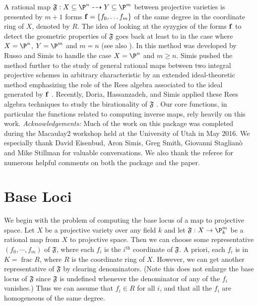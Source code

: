 \documentclass[11pt]{amsart}
\numberwithin{equation}{theorem}
\def\ff{{\bf f}}
\renewcommand{\:}{\colon}
\DeclareMathOperator{\ffield}{frac} %
\theoremstyle{theorem}
\begin{document}
A rational map $\mathfrak{F}:X\subseteq \P^n\dasharrow Y \subseteq \P^m$ between projective varieties is presented by $m+1$ forms $\ff=\{f_0,\ldots f_m\}$ of the same degree in the coordinate ring of $X$, denoted by  $R$.
The idea of looking at the syzygies of the forms $\ff$ to detect the geometric properties of  $\mathfrak{F}$ goes
back at least to \cite{HulekKatzSchreyer} in the case
where $X=\P^n$, $Y = \P^m$ and $m=n$ (see also \cite{SempleTyrrell}). In \cite{RussoSimisCompositio}  this method was developed by Russo and Simis
to handle the case $X=\P^n$ and $m\geq n$. Simis pushed the method further to the study
of general rational maps between two integral projective schemes in
arbitrary characteristic by an extended ideal-theoretic method
emphasizing the role of the Rees algebra associated to the ideal
generated by $\ff$ \cite{SimisCremona}.  Recently,  Doria, Hassanzadeh, and Simis applied these
 Rees algebra techniques to study the birationality of  $\mathfrak{F}$ \cite{DoriaHassanzadehSimisBirationality}.  Our core functions, in particular the functions related to computing inverse maps, rely heavily on this work.
\vskip 12pt
\noindent
\emph{Acknowledgements:}  Much of the work  on this package was completed during the Macaulay2 workshop held at the University of Utah in May 2016.  We especially thank David Eisenbud, Aron Simis, Greg Smith, Giovanni Staglian\`o and Mike Stillman for valuable conversations.  We also thank the referee for numerous helpful comments on both the package and the paper.

\section{Base Loci}

We begin with the problem of computing the base locus of a map to projective space. Let $X$ be a projective variety over any field $k$ and let $\mathfrak{F}: X \to \P_k^m$ be a rational map from $X$ to projective space. Then we can choose some representative $(f_0, \cdots, f_m)$ of $\mathfrak{F}$, where each $f_i$ is the $i^{\textrm{th}}$ coordinate of $\mathfrak{F}$. A priori, each $f_i$ is in $K = \ffield R$, where $R$ is the coordinate ring of $X$. However, we can get another representative of $\mathfrak{F}$ by clearing denominators. (Note this does not enlarge the base locus of $\mathfrak{F}$ since $\mathfrak{F}$ is undefined whenever the denominator of any of the $f_i$ vanishes.) Thus we can assume that $f_i\in R$ for all $i$, and that all the $f_i$ are homogeneous of the same degree.
\end{document}
